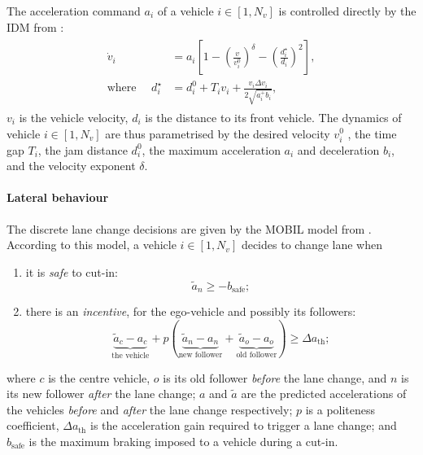 The acceleration command $a_i$ of a vehicle $i\in[1, N_v]$ is controlled directly by the \gls{IDM} from \citep{Treiber2000}:
\begin{align}
\begin{split}
\dot{v}_i &= a_i\left[1-\left(\frac{v}{v_i^0}\right)^\delta - \left(\frac{d^{\star}_i}{d_i}\right)^2\right], \\
\text{where }\quad d^{\star}_i &= d_i^0 + T_i v_i + \frac{v_i\Delta v_i}{2\sqrt{a_i^+ b_i}},
\end{split}
\end{align}
$v_i$ is the vehicle velocity, $d_i$ is the distance to its front vehicle.
The dynamics of vehicle $i\in[1, N_v]$ are thus parametrised by the desired velocity $v_i^0$ , the time gap $T_i$, the jam distance $d_i^0$, the maximum acceleration $a_i$ and deceleration $b_i$, and the velocity exponent $\delta$.

\paragraph{Lateral behaviour}

The discrete lane change decisions are given by the \gls{MOBIL} model from \citep{Kesting2007}.
According to this model, a vehicle $i\in[1, N_v]$ decides to change lane when

\begin{enumerate}[label=(\roman*)]
	\item it is \emph{safe} to cut-in:
		\begin{equation*}
			\tilde{a}_n \geq - b_\text{safe};
		\end{equation*}
	\item there is an \emph{incentive}, for the ego-vehicle and possibly its followers:
		\begin{equation*}
		\underbrace{\tilde{a}_c - a_c}_{\text{the vehicle}} + p\left(\underbrace{\tilde{a}_n - a_n}_{\text{new follower}} + \underbrace{\tilde{a}_o - a_o}_{\text{old follower}}\right) \geq \Delta a_\text{th};
		\end{equation*}
\end{enumerate}
where $c$ is the centre vehicle, $o$ is its old follower \emph{before} the lane change, and $n$ is its new follower \emph{after} the lane change; $a$ and $\tilde{a}$ are the predicted accelerations of the vehicles \emph{before} and \emph{after} the lane change respectively; $p$ is a politeness coefficient, $\Delta a_\text{th}$ is the acceleration gain required to trigger a lane change; and $b_\text{safe}$ is the maximum braking imposed to a vehicle during a cut-in.

